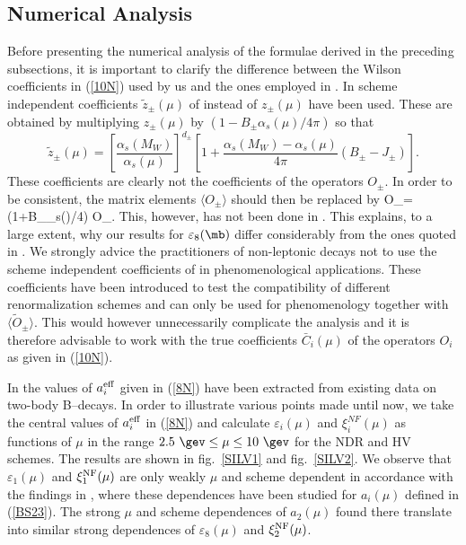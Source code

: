 \subsection{Numerical Analysis}
Before presenting the numerical analysis of the formulae derived in
the preceding subsections, it is important  to clarify the difference
between the Wilson coefficients in (\ref{10N}) used by
us and the ones employed in \cite{NS97}. In \cite{NS97} scheme
independent coefficients $\tilde z_\pm(\mu)$ of \cite{WEISZ}  
instead of $z_\pm(\mu)$ have been used. These are obtained by
multiplying $z_\pm(\mu)$ by $(1-B_\pm \alpha_s(\mu)/4\pi)$ 
so that
\begin{equation}\label{T11}
\tilde z_\pm(\mu)=
      \left[\frac{\alpha_s(M_W)}{\alpha_s(\mu)}\right]^{d_\pm}
\left[1+\frac{\alpha_s(M_W)-\alpha_s(\mu)}{4\pi}(B_\pm-J_\pm)\right].
\end{equation}
These coefficients are clearly not the coefficients of the operators
$O_\pm$. 
In order to be consistent, the matrix elements $\langle O_\pm \rangle$
should then be replaced by
\be\label{TOPM}
\langle \tilde O_\pm \rangle=
(1+B_\pm \alpha_s(\mu)/4\pi) \langle O_\pm \rangle.
\ee
This, however, has not been done in \cite{NS97}. This explains, to a large
extent, why our results for $\varepsilon_8(\mb)$  differ considerably from 
the ones quoted in \cite{NS97}.
We strongly advice the practitioners of
non-leptonic decays not to use the scheme independent coefficients
of \cite{WEISZ} in phenomenological applications. These coefficients
have been introduced to test the compatibility of different 
renormalization schemes and can only be used for phenomenology
together with $\langle \tilde O_\pm \rangle$. This would however
unnecessarily complicate the analysis and it is therefore advisable
to  work with the true coefficients $\bar C_i(\mu)$ of the operators $O_i$ 
as given in (\ref{10N}).

In \cite{NS97} the values of $a_i^{\rm eff}$ given in (\ref{8N}) 
have been
extracted from existing data on two-body B--decays.
In order to illustrate various points made until now,
we take the central values of $a_i^{\rm eff}$ in (\ref{8N})
and calculate $\varepsilon_i(\mu)$
and $\xi_i^{NF}(\mu)$ as  functions of $\mu$ in the range
$2.5~\gev \le \mu \le 10~\gev$ for the NDR and HV schemes. The
results are shown in fig.~\ref{SILV1}  and fig.~\ref{SILV2}.
We observe that $\varepsilon_1(\mu)$ and 
$\xi^{\rm NF}_1(\mu)$ are only weakly $\mu$ and scheme
dependent in accordance with the findings in \cite{AJB94a},
where these dependences have been studied for $a_i(\mu)$
defined in (\ref{BS23}). The strong $\mu$ and scheme dependences
of $a_2(\mu)$ found there translate into similar strong dependences
of $\varepsilon_8(\mu)$ and $\xi_2^{\rm NF}(\mu)$.

